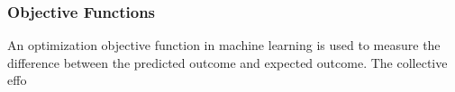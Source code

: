\subsubsection{Objective Functions}
An optimization objective function in machine learning is used to measure the difference between the predicted outcome and expected outcome. The collective effo